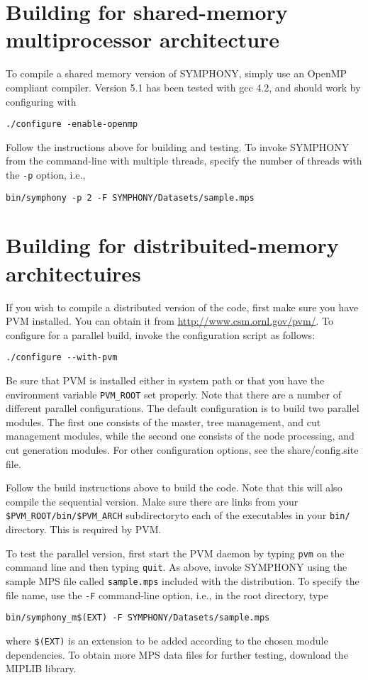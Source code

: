 \section{Building for shared-memory multiprocessor architecture}

To compile a shared memory version of SYMPHONY, simply use an OpenMP compliant
compiler. Version 5.1 has been tested with gcc 4.2, and should work by
configuring with
{\color{Brown}
\begin{verbatim}
./configure -enable-openmp
\end{verbatim}
}
Follow the instructions above for building and testing. To invoke SYMPHONY
from the command-line with multiple threads, specify the number of threads
with the \texttt{-p} option, i.e.,
{\color{Brown}
\begin{verbatim}
bin/symphony -p 2 -F SYMPHONY/Datasets/sample.mps
\end{verbatim}
}
\section{Building for distribuited-memory architectuires}

If you wish to compile a distributed version of the code, first make sure
you have PVM installed. You can obtain it from
\url{http://www.csm.ornl.gov/pvm/}. To configure for a parallel build, invoke
the configuration script as follows:
{\color{Brown}
\begin{verbatim}
./configure --with-pvm
\end{verbatim}
}
Be sure that PVM is installed either in system path or that you have the
environment variable \texttt{PVM\_ROOT} set properly. Note that there are a
number of different parallel configurations. The default configuration is to
build two parallel modules. The first one consists of the master, tree
management, and cut management modules, while the second one consists of the
node processing, and cut generation modules. For other configuration options,
see the share/config.site file.

Follow the build instructions above to build the code. Note that this will
also compile the sequential version. Make sure there are links from your
\texttt{\$PVM\_ROOT/bin/\$PVM\_ARCH} subdirectoryto each of the executables in
your \texttt{bin/} directory. This is required by PVM.

To test the parallel version, first start the PVM daemon by typing
\texttt{pvm} on the command line and then typing \texttt{quit}. As above,
invoke SYMPHONY using the sample MPS file called \texttt{sample.mps} included
with the distribution. To specify the file name, use the \texttt{-F}
command-line option, i.e., in the root directory, type
{\color{Brown}
\begin{verbatim}
bin/symphony_m$(EXT) -F SYMPHONY/Datasets/sample.mps 
\end{verbatim}
}
where \texttt{\$(EXT)} is an extension to be added according to the chosen
module dependencies. To obtain more MPS data files for further testing,
download the MIPLIB library.

